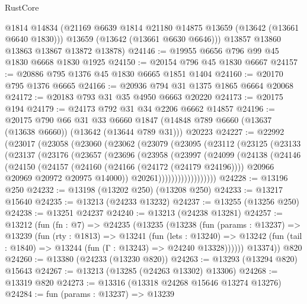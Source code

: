 \begin{lexlean}{RustCore}
\begin{coremodule}
        @1814
        @14834
        (@21169 @6639 @1814 @21180 @14875 @13659 (@13642 (@13661 @6640 @1830)))
        @13659
        (@13642 (@13661 @6630 @6646)))
      @13857
      @13860
      @13863
      @13867
      @13872
      @13878)
@24146 := @19955 @6656 @796 @99 @45 @1830 @6668 @1830 @1925
@24150 := @20154 @796 @45 @1830 @6667
@24157 := @20886 @795 @1376 @45 @1830 @6665 @1851 @1404
@24160 := @20170 @795 @1376 @6665
@24166 := @20936 @794 @31 @1375 @1865 @6664 @20068
@24172 := @20183 @793 @31 @35 @4950 @6663 @20220
@24173 := @20175 @194
@24179 := @24173 @792 @31 @34 @2206 @6662 @14857
@24196 := @20175
    @790
    @66
    @31
    @33
    @6660
    @1847
    (@14848 @789 @6660 (@13637 (@13638 @6660)) (@13642 (@13644 @789 @31)))
    @20223
@24227 := @22992
    (@23017
      (@23058
        (@23060
          (@23062
            (@23079
              (@23095
                (@23112
                  (@23125
                    (@23133
                      (@23137
                        (@23176
                          (@23657
                            (@23696
                              (@23958
                                (@23997
                                  (@24099
                                    (@24138
                                      (@24146
                                        (@24150
                                          (@24157
                                            (@24160 (@24166 (@24172 (@24179 @24196))))
                                            @20966
                                            @20969
                                            @20972
                                            @20975
                                            @14000))
                                        @20261))))))))))))))))))
@24228 := @13196 @250
@24232 := @13198 (@13202 @250) (@13208 @250)
@24233 := @13217 @15640
@24235 := @13213 (@24233 @13232)
@24237 := @13255 (@13256 @250)
@24238 := @13251 @24237
@24240 := @13213 (@24238 @13281)
@24257 := @13212
    (fun (fn : @7) =>
    @24235
      (@13235
        (@13238
          (fun (params : @13237) =>
          @13239
            (fun (rty : @1813) =>
            @13241
              (fun (lets : @13240) =>
              @13242 (fun (tail : @1840) => @13244 (fun (Γ : @13243) => @24240 @13328))))))
        @13374))
    @820
@24260 := @13380 (@24233 (@13230 @820))
@24263 := @13293 (@13294 @820) @15643
@24267 := @13213 (@13285 (@24263 @13302) @13306)
@24268 := @13319 @820
@24273 := @13316 (@13318 @24268 @15646 @13274 @13276)
@24284 := fun (params : @13237) =>
  @13239

\end{coremodule}
\end{lexlean}
